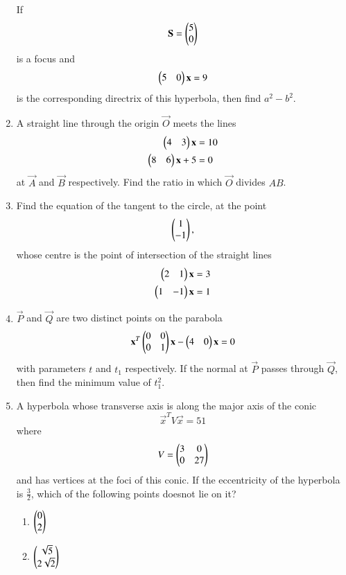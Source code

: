 \documentclass[journal,12pt,twocolumn]{IEEEtran}
\begin{document}
\begin{enumerate}[label=\arabic*.]
If 
\begin{equation} 
\mathbf{S}=\begin{pmatrix}5\\ 0\end{pmatrix}
\end{equation}
is a focus and 
\begin{equation} 
\begin{pmatrix}5 & 0\end{pmatrix}\mathbf{x} = 9
\end{equation} 
%
is the corresponding directrix of this hyperbola, then find $a^2-b^2$.
\item A straight line through the origin   $\vec{O}$ meets the lines
\begin{align} 
\begin{pmatrix}4 & 3\end{pmatrix}\mathbf{x} &= 10
\\
\begin{pmatrix}8 & 6\end{pmatrix}\mathbf{x} +5&= 0
\end{align} 
%
at $\vec{A}$ and $\vec{B}$ respectively.  Find the ratio in which  $\vec{O}$ divides $AB$.
\item Find the equation of the tangent to the circle, at the point
\begin{equation}
\begin{pmatrix}1\\ -1\end{pmatrix},
\end{equation}
whose centre is the point of intersection of the straight lines
\begin{align} 
\begin{pmatrix}2 & 1\end{pmatrix}\mathbf{x} &= 3
\\
\begin{pmatrix}1 & -1\end{pmatrix}\mathbf{x} &= 1
\end{align} 
\item $\vec{P}$ and $\vec{Q}$ are two distinct points on the parabola
\begin{equation}
\mathbf{x}^T\begin{pmatrix}0 & 0 \\ 0 & 1\end{pmatrix}\mathbf{x} -\begin{pmatrix}4 & 0 \end{pmatrix}\mathbf{x} 
 = 0
\end{equation}
with parameters $t$ and $t_1$ respectively.  If the normal at $\vec{P} $ passes through $\vec{Q}$, then find 
the minimum value of $t_1^2$.
\item A hyperbola whose transverse axis is along the major axis of the conic
\begin{equation}
\vec{x}^TV\vec{x} =51
\end{equation}
%
where
\begin{equation}
V = \begin{pmatrix}3 & 0 \\ 0 & 27\end{pmatrix}
\end{equation}
and has vertices at the foci of this conic.  If the eccentricity of the hyperbola is $\frac{3}{2}$, which of 
the following points doesnot lie on it?
\begin{enumerate}
\item $\begin{pmatrix} 0 \\ 2\end{pmatrix}$
\item $\begin{pmatrix}\sqrt{5}  \\ 2\sqrt{2}\end{pmatrix}$

\end{enumerate}
\end{enumerate}
\end{document}

